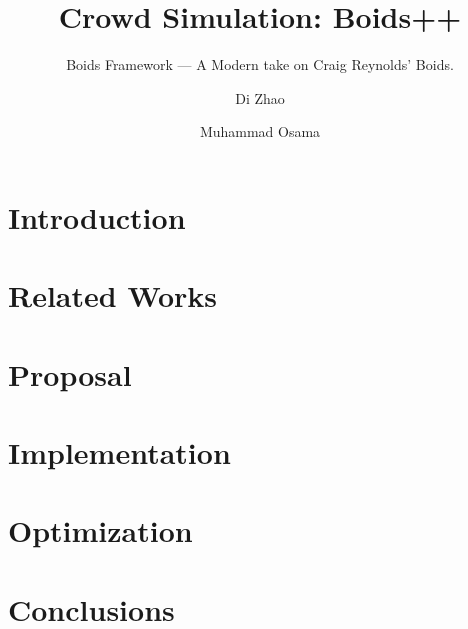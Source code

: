 \documentclass[acmtog]{acmart}
\begin{document}
\title{Crowd Simulation: Boids++}
\subtitle{Boids Framework --- A Modern take on Craig Reynolds' Boids.}

\author{Di Zhao}

\author{Muhammad Osama}

\begin{abstract}

\label{sec:abstract}
\end{abstract}


\maketitle

\section{Introduction}
\label{sec:intro}


\section{Related Works}
\label{sec:related}


\section{Proposal}
\label{sec:proposal}


\section{Implementation}
\label{sec:implementation}


\section{Optimization}
\label{sec:optimization}


\section{Conclusions}
\label{sec:conclusions}




\end{document}
